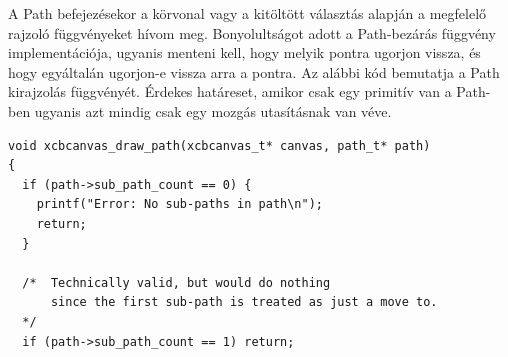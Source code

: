 A Path befejezésekor a körvonal vagy a kitöltött választás alapján a megfelelő rajzoló függvényeket hívom meg. Bonyolultságot adott a Path-bezárás függvény implementációja, ugyanis menteni kell, hogy melyik pontra ugorjon vissza, és hogy egyáltalán ugorjon-e vissza arra a pontra. Az alábbi kód bemutatja a Path kirajzolás függvényét. Érdekes határeset, amikor csak egy primitív van a Path-ben ugyanis azt mindig csak egy mozgás utasításnak van véve.


\begin{verbatim}
void xcbcanvas_draw_path(xcbcanvas_t* canvas, path_t* path)
{
  if (path->sub_path_count == 0) {
    printf("Error: No sub-paths in path\n");
    return;
  }

  /*  Technically valid, but would do nothing
      since the first sub-path is treated as just a move to.
  */
  if (path->sub_path_count == 1) return;


\end{verbatim}

